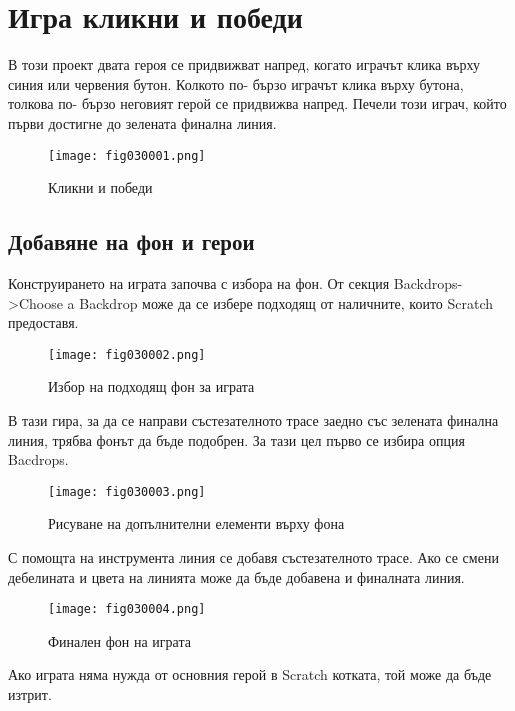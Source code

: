 \chapter{Игра кликни и победи}

В този проект двата героя се придвижват напред, когато играчът клика върху синия или червения бутон. Колкото по- бързо играчът клика върху бутона, толкова по- бързо неговият герой се придвижва напред. Печели този играч, който първи достигне до зелената финална линия.

\begin{figure}[H]
  \centering
  \texttt{[image: fig030001.png]}
  \caption{Кликни и победи}
\label{fig030001}
\end{figure}

\section{Добавяне на фон и герои}
Конструирането на играта започва с избора на фон. От секция Backdrops->Choose a Backdrop може да се избере подходящ от наличните, които Scratch предоставя.

\begin{figure}[H]
  \centering
  \texttt{[image: fig030002.png]}
  \caption{Избор на подходящ фон за играта}
\label{fig030002}
\end{figure}

В тази гира, за да се направи състезателното трасе заедно със зелената финална линия, трябва фонът да бъде подобрен. За тази цел първо се избира опция Bacdrops.

\begin{figure}[H]
  \centering
  \texttt{[image: fig030003.png]}
  \caption{Рисуване на допълнителни елементи върху фона}
\label{fig030003}
\end{figure}

С помощта на инструмента линия се добавя състезателното трасе. Ако се смени дебелината и цвета на линията може да бъде добавена и финалната линия.

\begin{figure}[H]
  \centering
  \texttt{[image: fig030004.png]}
  \caption{Финален фон на играта}
\label{fig030004}
\end{figure}

Ако играта няма нужда от основния герой в Scratch котката, той може да бъде изтрит.

